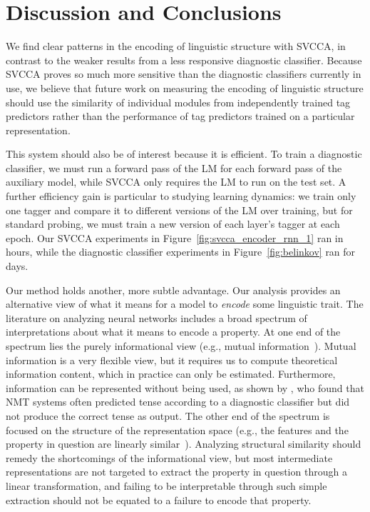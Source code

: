 

\section{Discussion and Conclusions}

We find clear patterns in the encoding of linguistic structure with SVCCA, in contrast to the weaker results from a less responsive diagnostic classifier. Because SVCCA proves so much more sensitive than the diagnostic classifiers currently in use, we believe that future work on measuring the encoding of linguistic structure should use the similarity of individual modules from independently trained tag predictors rather than the performance of tag predictors trained on a particular representation.

This system should also be of interest because it is efficient. To train a diagnostic classifier, we must run a forward pass of the LM for each forward pass of the auxiliary model,  while SVCCA only requires the LM  to run on the test set. A further efficiency gain is  particular  to studying learning dynamics: we train only one tagger and compare it to   different versions of the LM   over training, but  for standard probing, we must  train  a new  version of each layer's tagger at each epoch. Our SVCCA experiments  in Figure~\ref{fig:svcca_encoder_rnn_1} ran in hours, while the diagnostic classifier experiments in Figure~\ref{fig:belinkov}  ran for days.

Our method holds another, more subtle advantage. Our analysis provides an alternative view of what it means  for a model to \textit{encode} some linguistic trait. The literature on analyzing neural networks includes a broad spectrum of interpretations about what it means to encode a property. At one end of the spectrum lies  the purely informational view (e.g., mutual information~\cite{noshad_scalable_2018}). Mutual information is a very flexible view, but it  requires us to compute theoretical information content, which in practice can only be estimated. Furthermore, information can be represented without being used, as shown by \citeauthor{vanmassenhove_investigating_2017}, who found that NMT systems often predicted tense according to a diagnostic classifier but did not produce the correct tense as output. The other end of the spectrum is focused on the structure of the representation space (e.g., the features and the property in question are linearly similar~\cite{alishahi_encoding_2017}). Analyzing structural similarity should remedy  the shortcomings of the informational view, but  most intermediate representations  are not targeted  to extract the property in question through a  linear transformation, and failing to be interpretable through  such simple extraction should not be equated  to a failure to encode  that property. 
 
